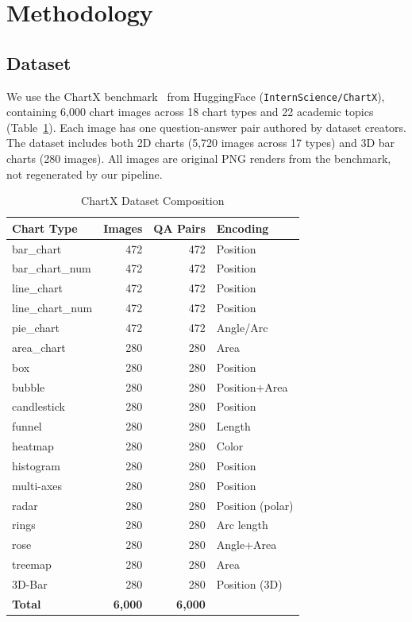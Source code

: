 \documentclass[sigconf, 10pt]{acmart}
\begin{document}
\section{Methodology}

\subsection{Dataset}
We use the ChartX benchmark~\cite{chartx} from HuggingFace (\texttt{InternScience/ChartX}), containing 6,000 chart images across 18 chart types and 22 academic topics (Table~\ref{tab:dataset}). Each image has one question-answer pair authored by dataset creators. The dataset includes both 2D charts (5,720 images across 17 types) and 3D bar charts (280 images). All images are original PNG renders from the benchmark, not regenerated by our pipeline.

\begin{table}[h]
\caption{ChartX Dataset Composition}
\label{tab:dataset}
\small
\begin{tabular}{lrrl}
\toprule
\textbf{Chart Type} & \textbf{Images} & \textbf{QA Pairs} & \textbf{Encoding} \\
\midrule
bar\_chart & 472 & 472 & Position \\
bar\_chart\_num & 472 & 472 & Position \\
line\_chart & 472 & 472 & Position \\
line\_chart\_num & 472 & 472 & Position \\
pie\_chart & 472 & 472 & Angle/Arc \\
area\_chart & 280 & 280 & Area \\
box & 280 & 280 & Position \\
bubble & 280 & 280 & Position+Area \\
candlestick & 280 & 280 & Position \\
funnel & 280 & 280 & Length \\
heatmap & 280 & 280 & Color \\
histogram & 280 & 280 & Position \\
multi-axes & 280 & 280 & Position \\
radar & 280 & 280 & Position (polar) \\
rings & 280 & 280 & Arc length \\
rose & 280 & 280 & Angle+Area \\
treemap & 280 & 280 & Area \\
3D-Bar & 280 & 280 & Position (3D) \\
\midrule
\textbf{Total} & \textbf{6,000} & \textbf{6,000} & \\
\bottomrule
\end{tabular}
\end{table}
\end{document}
